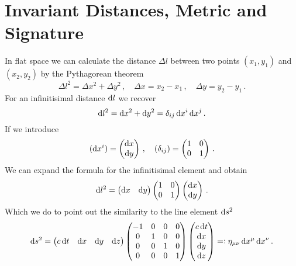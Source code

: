 \section{Invariant Distances, Metric and Signature}
In flat space we can calculate the distance $\Delta l$ between two points
$(x_1,y_1)$ and $(x_2,y_2)$ by the Pythagorean theorem
\begin{equation}
\Delta l^2=\Delta x^2+\Delta y^2\, ,
\quad \Delta x=x_2-x_1\,,\quad \Delta
y=y_2-y_1\, .
\end{equation}
For an infinitisimal distance $\dif l$ we recover
\begin{equation}
\dif l^2=\dif x^2+\dif y^2=\delta_{ij}\dif x^i\dif x^j\, .
\end{equation}
If we introduce
\begin{equation}
(\dif x^i)=\begin{pmatrix}
\dif x\\
\dif y
\end{pmatrix}\,,\quad (\delta_{ij})
=\begin{pmatrix}
1 & 0\\
0 & 1
\end{pmatrix}\, .
\end{equation}
We can expand the formula for the infinitisimal element and obtain
\begin{equation}
\dif l^2=\begin{pmatrix}
\dif x & 
\dif y
\end{pmatrix}
\begin{pmatrix}
1 & 0\\
0 & 1
\end{pmatrix}
\begin{pmatrix}
\dif x\\
\dif y
\end{pmatrix}\, .
\end{equation}
Which we do to point out the similarity to the line element $\dif s^2$
\begin{equation}
\dif s^2=\begin{pmatrix}
c\dif t & 
\dif x & 
\dif y &
\dif z 
\end{pmatrix}
\begin{pmatrix}
-1 & 0 & 0 & 0\\
0  & 1 & 0 & 0\\
0  & 0 & 1 & 0\\
0  & 0 & 0 & 1\\
\end{pmatrix}
\begin{pmatrix}
c\dif t\\
\dif x\\
\dif y\\
\dif z\\
\end{pmatrix}=:\eta_{\mu\nu}\dif x^\mu\dif x^\nu\, .
\end{equation}
